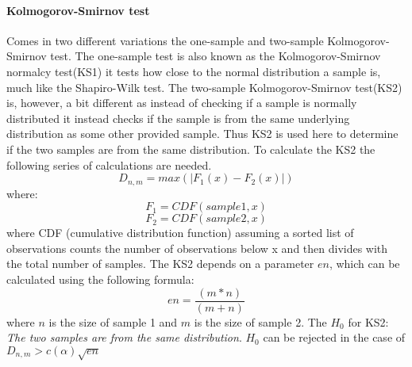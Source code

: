 \paragraph{Kolmogorov-Smirnov test}
Comes in two different variations the one-sample and two-sample Kolmogorov-Smirnov test. The one-sample test is also known as the Kolmogorov-Smirnov normalcy test(KS1) it tests how close to the normal distribution a sample is, much like the Shapiro-Wilk test. The two-sample Kolmogorov-Smirnov test(KS2) is, however, a bit different as instead of checking if a sample is normally distributed it instead checks if the sample is from the same underlying distribution as some other provided sample. Thus KS2 is used here to determine if the two samples are from the same distribution. To calculate the KS2 the following series of calculations are needed.
$$D_{n,m} = max(|F_1(x)-F_2(x)|)$$
where:
$$F_1 = CDF(sample1,x)$$
$$F_2 = CDF(sample2,x)$$
where CDF (cumulative distribution function) assuming a sorted list of observations counts the number of observations below x and then divides with the total number of samples. The KS2 depends on a parameter $en$, which can be calculated using the following formula:
$$en=\frac{(m*n)}{(m+n)}$$
where $n$ is the size of sample 1 and $m$ is the size of sample 2.
The $H_0$ for KS2: \textit{The two samples are from the same distribution}.
$H_0$ can be rejected in the case of $D_{n,m} > c(\alpha)\sqrt{en}$\cite{massey1951kolmogorov}

